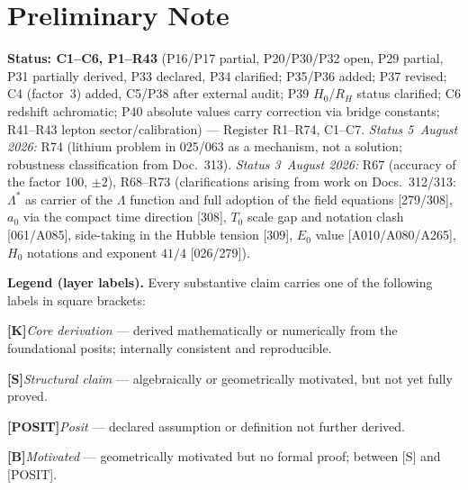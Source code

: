 
\section*{Preliminary Note}

\textbf{Status: C1--C6, P1--R43} (P16/P17 partial, P20/P30/P32 open, P29 partial, P31 partially derived, P33 declared, P34 clarified; P35/P36 added; P37 revised; C4 (factor~3) added, C5/P38 after external audit; P39 $H_0$/$R_H$ status clarified; C6 redshift achromatic; P40 absolute values carry correction via bridge constants; R41--R43 lepton sector/calibration) --- Register R1--R74, C1--C7. \emph{Status 5~August 2026:} R74 (lithium problem in 025/063 as a mechanism, not a solution; robustness classification from Doc.~313). \emph{Status 3~August 2026:} R67 (accuracy of the factor 100, $\pm2$), R68--R73 (clarifications arising from work on Docs.~312/313: $\Lambda^{*}$ as carrier of the $\Lambda$ function and full adoption of the field equations [279/308], $a_0$ via the compact time direction [308], $T_0$ scale gap and notation clash [061/A085], side-taking in the Hubble tension [309], $E_0$ value [A010/A080/A265], $H_0$ notations and exponent $41/4$ [026/279]).

\medskip
\noindent\textbf{Legend (layer labels).}
Every substantive claim carries one of the following labels in square brackets:

\smallskip
\smallskip\noindent \textbf{[K]}\quad \emph{Core derivation} — derived mathematically or numerically from the foundational posits; internally consistent and reproducible.

\smallskip\noindent \textbf{[S]}\quad \emph{Structural claim} — algebraically or geometrically motivated, but not yet fully proved.

\smallskip\noindent \textbf{[POSIT]}\quad \emph{Posit} — declared assumption or definition not further derived.

\smallskip\noindent \textbf{[B]}\quad \emph{Motivated} — geometrically motivated but no formal proof; between [S] and [POSIT].

